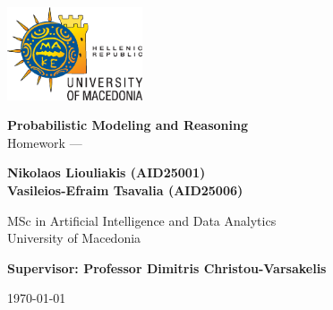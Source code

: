 \begin{titlepage}
    \centering

    \vfill
    \includegraphics[width=0.3\textwidth]{UOMLOGOEN.eps}
    \vfill

    {\Huge \textbf{Probabilistic Modeling and Reasoning}} \\
    {\LARGE Homework — \HomeworkNumber}

    \vfill  %
    {\Large \textbf{Nikolaos Liouliakis (AID25001)}} \\
    {\Large \textbf{Vasileios-Efraim Tsavalia (AID25006)}}



    \vfill

    {\Large MSc in Artificial Intelligence and Data Analytics} \\
    {\Large University of Macedonia}

    \vfill

    {\Large \textbf{Supervisor: Professor Dimitris Christou-Varsakelis}}

    \vfill

    {\Large \monthyeardate\today} %
    
\end{titlepage}


\newpage
